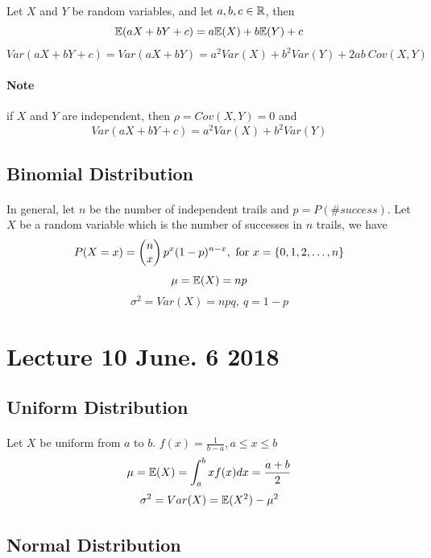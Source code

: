 \documentclass{article}
\begin{document}
			\paragraph{} Let $X$ and $Y$ be random variables, and let $a,b,c \in \mathbb{R}$, then
				\[
					\mathbb{E}({aX+bY+c}) = a\mathbb{E}({X}) + b\mathbb{E}({Y}) + c
				\]
				\[
					Var(aX+bY+c) = Var(aX + bY) = a^2 Var(X) + b^2 Var(Y) + 2ab\ Cov(X,Y)
				\]
			\paragraph{Note} if $X$ and $Y$ are independent, then $\rho = Cov(X,Y) = 0$ and 
				\[
					Var(aX+bY+c) = a^2 Var(X) + b^2 Var(Y)
				\]
				
		\subsection{Binomial Distribution}
			\paragraph{} In general, let $n$ be the number of independent trails and $p = P(\#success)$. Let $X$ be a random variable which is the number of successes in $n$ trails, we have
			\[
				P(X=x) = \begin{pmatrix}
					n \\
					x
				\end{pmatrix} p^x (1-p)^{n-x},\text{{ for }} x = \{0,1,2,\dots,n\}
			\]
			\[
				\mu = \mathbb{E}({X}) = np
			\]
			\[
				\sigma^2 = Var(X) = npq,\ q = 1-p
			\]
		
	\section{Lecture 10 June. 6 2018}
		\subsection{Uniform Distribution}
			\paragraph{} Let $X$ be uniform from $a$ to $b$. $f(x) = \frac{1}{b-a}, a \leq x \leq b$
			\[
				\mu = \mathbb{E}({X}) = \int_a^b{xf(x)dx} = \frac{a+b}{2}
			\]
			\[
				\sigma^2 = Var(X) = \mathbb{E}({X^2}) - \mu^2
			\]
		\subsection{Normal Distribution}
\end{document}
